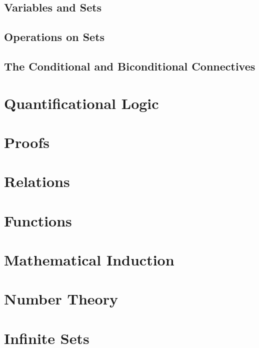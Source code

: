 \documentclass{report}
\begin{document}
    \section{Variables and Sets}
    \section{Operations on Sets}
    \section{The Conditional and Biconditional Connectives}

\chapter{Quantificational Logic}
\chapter{Proofs}
\chapter{Relations}
\chapter{Functions}
\chapter{Mathematical Induction}
\chapter{Number Theory}
\chapter{Infinite Sets}
\end{document}
